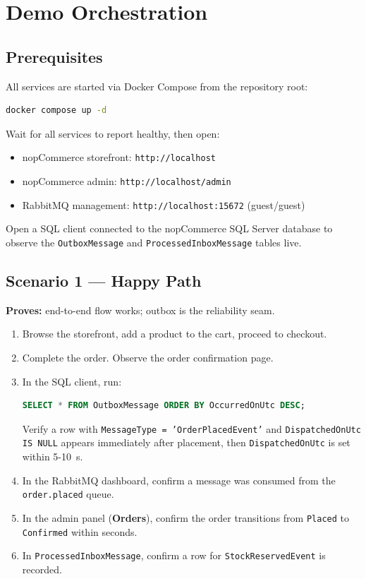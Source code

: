 \chapter{Demo Orchestration}
\label{ch:demo}

\section{Prerequisites}

All services are started via Docker Compose from the repository root:

\begin{lstlisting}[language=bash, caption={Start the full environment}]
docker compose up -d
\end{lstlisting}

Wait for all services to report healthy, then open:
\begin{itemize}
    \item nopCommerce storefront: \texttt{http://localhost}
    \item nopCommerce admin: \texttt{http://localhost/admin}
    \item RabbitMQ management: \texttt{http://localhost:15672} (guest/guest)
\end{itemize}

Open a SQL client connected to the nopCommerce SQL Server database to observe the \texttt{OutboxMessage} and \texttt{ProcessedInboxMessage} tables live.

\section{Scenario 1 — Happy Path}
\label{sec:demo-happy}

\textbf{Proves:} end-to-end flow works; outbox is the reliability seam.

\begin{enumerate}
    \item Browse the storefront, add a product to the cart, proceed to checkout.
    \item Complete the order. Observe the order confirmation page.
    \item In the SQL client, run:
    \begin{lstlisting}[language=SQL]
SELECT * FROM OutboxMessage ORDER BY OccurredOnUtc DESC;
    \end{lstlisting}
    Verify a row with \texttt{MessageType = 'OrderPlacedEvent'} and \texttt{DispatchedOnUtc IS NULL} appears immediately after placement, then \texttt{DispatchedOnUtc} is set within 5-10~s.
    \item In the RabbitMQ dashboard, confirm a message was consumed from the \texttt{order.placed} queue.
    \item In the admin panel (\textbf{Orders}), confirm the order transitions from \texttt{Placed} to \texttt{Confirmed} within seconds.
    \item In \texttt{ProcessedInboxMessage}, confirm a row for \texttt{StockReservedEvent} is recorded.
\end{enumerate}


